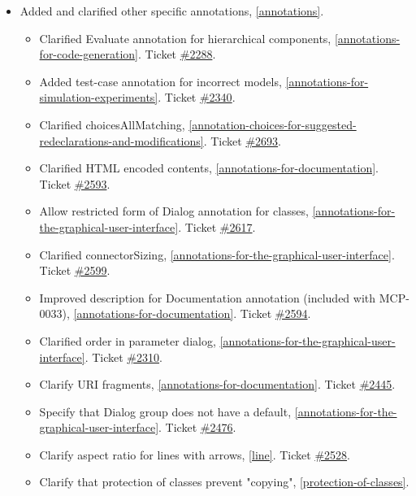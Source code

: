 \begin{itemize}
\item Added and clarified other specific annotations, \cref{annotations}.
\begin{itemize}
\item Clarified Evaluate annotation for hierarchical components, \cref{annotations-for-code-generation}.
Ticket \href{https://github.com/modelica/ModelicaSpecification/issues/2288}{\#2288}.
\item Added test-case annotation for incorrect models, \cref{annotations-for-simulation-experiments}.
Ticket \href{https://github.com/modelica/ModelicaSpecification/issues/2340}{\#2340}.
\item Clarified choicesAllMatching, \cref{annotation-choices-for-suggested-redeclarations-and-modifications}.
Ticket \href{https://github.com/modelica/ModelicaSpecification/issues/2693}{\#2693}.
\item Clarified HTML encoded contents, \cref{annotations-for-documentation}.
Ticket \href{https://github.com/modelica/ModelicaSpecification/pull/2593}{\#2593}.
\item Allow restricted form of Dialog annotation for classes, \cref{annotations-for-the-graphical-user-interface}.
Ticket \href{https://github.com/modelica/ModelicaSpecification/issues/2617}{\#2617}.
\item Clarified connectorSizing, \cref{annotations-for-the-graphical-user-interface}.
Ticket \href{https://github.com/modelica/ModelicaSpecification/pull/2599}{\#2599}.
\item Improved description for Documentation annotation (included with MCP-0033), \cref{annotations-for-documentation}.
Ticket \href{https://github.com/modelica/ModelicaSpecification/pull/2594}{\#2594}.
\item Clarified order in parameter dialog, \cref{annotations-for-the-graphical-user-interface}.
Ticket \href{https://github.com/modelica/ModelicaSpecification/issues/2310}{\#2310}.
\item Clarify URI fragments, \cref{annotations-for-documentation}.
Ticket \href{https://github.com/modelica/ModelicaSpecification/issues/2445}{\#2445}.
\item Specify that Dialog group does not have a default, \cref{annotations-for-the-graphical-user-interface}.
Ticket \href{https://github.com/modelica/ModelicaSpecification/issues/2476}{\#2476}.
\item Clarify aspect ratio for lines with arrows, \cref{line}.
Ticket \href{https://github.com/modelica/ModelicaSpecification/issues/2528}{\#2528}.
\item Clarify that protection of classes prevent "copying", \cref{protection-of-classes}.

\end{itemize}
\end{itemize}

